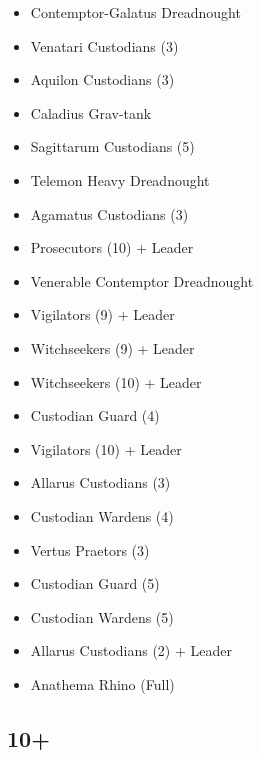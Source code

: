 \documentclass{HordeModeTarot}
\begin{document}
\begin{multicols}{2}
\begin{itemize}[leftmargin=*]
\item[] Contemptor-Galatus Dreadnought
\item[] Venatari Custodians (3)
\item[] Aquilon Custodians (3)
\item[] Caladius Grav-tank
\item[] Sagittarum Custodians (5)
\item[] Telemon Heavy Dreadnought
\item[] Agamatus Custodians (3)
\item[] Prosecutors (10) + Leader
\item[] Venerable Contemptor Dreadnought
\item[] Vigilators (9) + Leader
\item[] Witchseekers (9) + Leader
\item[] Witchseekers (10) + Leader
\item[] Custodian Guard (4)
\item[] Vigilators (10) + Leader
\item[] Allarus Custodians (3)
\item[] Custodian Wardens (4)
\item[] Vertus Praetors (3)
\item[] Custodian Guard (5)
\item[] Custodian Wardens (5)
\item[] Allarus Custodians (2) + Leader
\item[] Anathema Rhino (Full)
\end{itemize}

\subsection*{10+}


\end{multicols}
\end{document}
